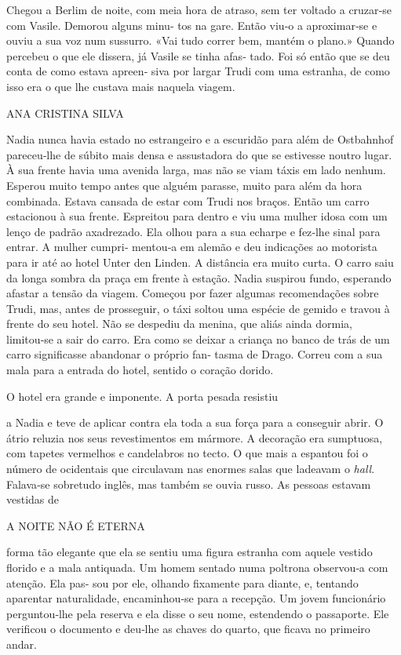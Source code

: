 Chegou a Berlim de noite, com meia hora de atraso, sem ter voltado a
cruzar‑se com Vasile. Demorou alguns minu‑ tos na gare. Então viu‑o a
aproximar‑se e ouviu a sua voz num sussurro. «Vai tudo correr bem,
mantém o plano.» Quando percebeu o que ele dissera, já Vasile se tinha
afas‑ tado. Foi só então que se deu conta de como estava apreen‑ siva
por largar Trudi com uma estranha, de como isso era o que lhe custava
mais naquela viagem.

ANA CRISTINA SILVA

Nadia nunca havia estado no estrangeiro e a escuridão para além de
Ostbahnhof pareceu‑lhe de súbito mais densa e assustadora do que se
estivesse noutro lugar. À sua frente havia uma avenida larga, mas não se
viam táxis em lado nenhum. Esperou muito tempo antes que alguém parasse,
muito para além da hora combinada. Estava cansada de estar com Trudi nos
braços. Então um carro estacionou à sua frente. Espreitou para dentro e
viu uma mulher idosa com um lenço de padrão axadrezado. Ela olhou para a
sua echarpe e fez‑lhe sinal para entrar. A mulher cumpri‑ mentou‑a em
alemão e deu indicações ao motorista para ir até ao hotel Unter den
Linden. A distância era muito curta. O carro saiu da longa sombra da
praça em frente à estação. Nadia suspirou fundo, esperando afastar a
tensão da viagem. Começou por fazer algumas recomendações sobre Trudi,
mas, antes de prosseguir, o táxi soltou uma espécie de gemido e travou à
frente do seu hotel. Não se despediu da menina, que aliás ainda dormia,
limitou‑se a sair do carro. Era como se deixar a criança no banco de
trás de um carro significasse abandonar o próprio fan‑ tasma de Drago.
Correu com a sua mala para a entrada do hotel, sentido o coração dorido.

O hotel era grande e imponente. A porta pesada resistiu

a Nadia e teve de aplicar contra ela toda a sua força para a conseguir
abrir. O átrio reluzia nos seus revestimentos em mármore. A decoração
era sumptuosa, com tapetes vermelhos e candelabros no tecto. O que mais
a espantou foi o número de ocidentais que circulavam nas enormes salas
que ladeavam o \emph{hall}. Falava‑se sobretudo inglês, mas também se
ouvia russo. As pessoas estavam vestidas de

A NOITE NÃO É ETERNA

forma tão elegante que ela se sentiu uma figura estranha com aquele
vestido florido e a mala antiquada. Um homem sentado numa poltrona
observou‑a com atenção. Ela pas‑ sou por ele, olhando fixamente para
diante, e, tentando aparentar naturalidade, encaminhou‑se para a
recepção. Um jovem funcionário perguntou‑lhe pela reserva e ela disse o
seu nome, estendendo o passaporte. Ele verificou o documento e deu‑lhe
as chaves do quarto, que ficava no primeiro andar.


